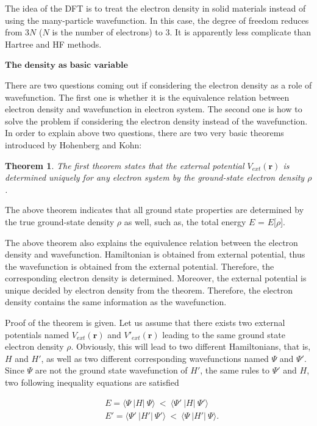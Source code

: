 \documentclass[a4paper, 12pt, titlepage,oneside,drop]{kthesis}
\newtheorem{thm}{Theorem}
\begin{document}
The idea of the DFT is to treat the electron density in solid materials instead of using the many-particle wavefunction. In this case, the degree of freedom reduces from 3$N$ ($N$ is the number of electrons) to 3.
It is apparently less complicate than Hartree and HF methods. 

$\textbf{The density as basic variable}$ 

There are two questions coming out if considering the electron density as a role of wavefunction. The first one is whether it is the equivalence relation between electron density and wavefunction in electron system. 
The second one is how to solve the problem if considering the electron density instead of the wavefunction. In order to explain above two questions, there are two very basic theorems introduced by Hohenberg and Kohn:

\begin{thm}
\label{hk1}
\noindent The first theorem states that the external potential $V_{ext}(\textbf{r})$  is determined uniquely for any electron system by the ground-state electron density $\rho$.
\end{thm}

The above theorem indicates that all ground state properties are determined by the true ground-state density $\rho$ as well,
such as, the total energy $E$ = $E$[$\rho$]. 

The above theorem also explains the equivalence relation between the electron density and wavefunction. Hamiltonian is obtained from external potential,
thus the wavefunction is obtained from the external potential. Therefore, the corresponding electron density is determined. Moreover, the external potential is unique decided by electron
density from the theorem. Therefore, the electron density contains the same information as the wavefunction.

Proof of the theorem is given. Let us assume that there exists two external potentials named $V_{ext}(\textbf{r})$ and $V'_{ext}(\textbf{r})$ leading to the same ground state 
electron density $\rho$. Obviously, this will lead to two different Hamiltonians, that is, ${H}$ and ${H'}$, as well as two different corresponding
wavefunctions named $\Psi$ and $\Psi'$. Since $\Psi$ are not the ground state wavefunction of ${H'}$, the same rules to $\Psi'$ and ${H}$, two following
inequality equations are satisfied

\begin{equation}\label{hkpf1}\begin{split}
&  E = \langle \Psi\ |{H}|\ \Psi \rangle  \ < \  \langle \Psi'\ |{H}|\ \Psi' \rangle \\
&  E' = \langle \Psi'\ |{H'}|\ \Psi' \rangle  \ < \  \langle \Psi\ |{H'}|\ \Psi \rangle.
\end{split}\end{equation}
\end{document}

